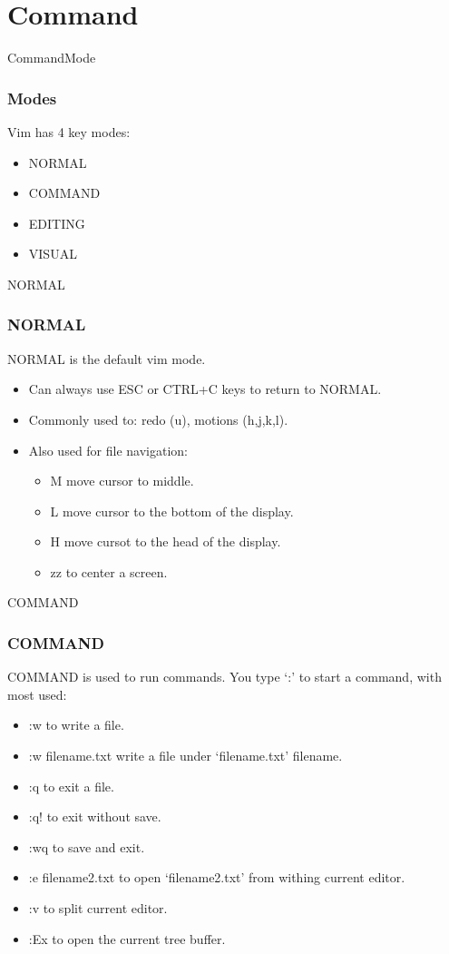 \documentclass{beamer}
\begin{document}
\section{Command}
\begin{frame}{CommandMode}
    \frametitle{Modes}
    Vim has 4 key modes:
    \begin{itemize}
        \item NORMAL
        \item COMMAND
        \item EDITING
        \item VISUAL
    \end{itemize}
\end{frame}

\begin{frame}{NORMAL}
    \frametitle{NORMAL}
    NORMAL is the default vim mode.
    \begin{itemize}
        \item Can always use ESC or CTRL+C keys to return to NORMAL.
        \item Commonly used to: redo (u), motions (h,j,k,l).
        \item Also used for file navigation:
            \begin{itemize}
                \item \textsf{M} move cursor to middle.
                \item \textsf{L} move cursor to the bottom of the display.
                \item \textsf{H} move cursot to the head of the display.
                \item \textsf{zz} to center a screen.
            \end{itemize}
    \end{itemize}
\end{frame}

\begin{frame}{COMMAND}
    \frametitle{COMMAND}
    COMMAND is used to run commands.
    You type `:' to start a command, with most used:
    \begin{itemize}
        \item \textsf{:w} to write a file.
        \item \textsf{:w filename.txt} write a file under `filename.txt' filename.
        \item \textsf{:q} to exit a file.
        \item \textsf{:q!} to exit without save.
        \item \textsf{:wq} to save and exit.
        \item \textsf{:e filename2.txt} to open `filename2.txt' from withing current editor.
        \item \textsf{:v} to split current editor.
        \item \textsf{:Ex} to open the current tree buffer.
    \end{itemize}
\end{frame}
\end{document}
